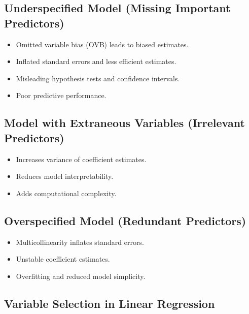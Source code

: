 \subsection{Underspecified Model (Missing Important Predictors)}

\begin{caution}
\begin{itemize}
\item Omitted variable bias (OVB) leads to biased estimates.
\item Inflated standard errors and less efficient estimates.
\item Misleading hypothesis tests and confidence intervals.
\item Poor predictive performance.
\end{itemize}
\end{caution}

\subsection{Model with Extraneous Variables (Irrelevant Predictors)}

\begin{notebox}
\begin{itemize}
\item Increases variance of coefficient estimates.
\item Reduces model interpretability.
\item Adds computational complexity.
\end{itemize}
\end{notebox}

\subsection{Overspecified Model (Redundant Predictors)}

\begin{caution}
\begin{itemize}
\item Multicollinearity inflates standard errors.
\item Unstable coefficient estimates.
\item Overfitting and reduced model simplicity.
\end{itemize}
\end{caution}

\subsection{Variable Selection in Linear Regression}

